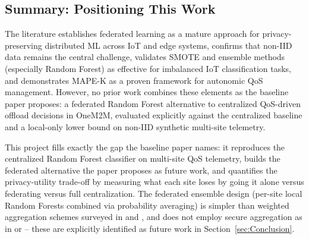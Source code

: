 \subsection{Summary: Positioning This Work}
\label{subsec:positioning}

The literature establishes federated learning as a mature approach for privacy-preserving distributed ML across IoT and edge systems, confirms that non-IID data remains the central challenge, validates SMOTE and ensemble methods (especially Random Forest) as effective for imbalanced IoT classification tasks, and demonstrates MAPE-K as a proven framework for autonomic QoS management. However, no prior work combines these elements as the baseline paper \cite{EtTousy26} proposes: a federated Random Forest alternative to centralized QoS-driven offload decisions in OneM2M, evaluated explicitly against the centralized baseline and a local-only lower bound on non-IID synthetic multi-site telemetry.

This project fills exactly the gap the baseline paper names: it reproduces the centralized Random Forest classifier on multi-site QoS telemetry, builds the federated alternative the paper proposes as future work, and quantifies the privacy-utility trade-off by measuring what each site loses by going it alone versus federating versus full centralization. The federated ensemble design (per-site local Random Forests combined via probability averaging) is simpler than weighted aggregation schemes surveyed in \cite{Jimenez24ARXIV} and \cite{Abreha26KBS}, and does not employ secure aggregation as in \cite{Bienstock25ICML} or \cite{Allouah24ICML} -- these are explicitly identified as future work in Section~\ref{sec:Conclusion}.

